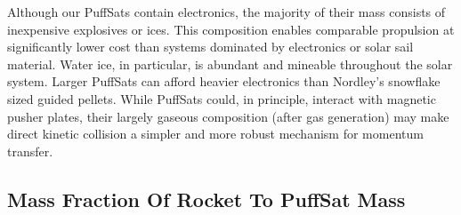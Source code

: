 \documentclass{article}
\begin{document}
Although our PuffSats contain electronics, the majority of their mass consists of inexpensive explosives or ices. This composition enables comparable propulsion at significantly lower cost than systems dominated by electronics or solar sail material. Water ice, in particular, is abundant and mineable throughout the solar system.  Larger PuffSats can afford heavier electronics than Nordley's snowflake sized guided pellets.  While PuffSats could, in principle, interact with magnetic pusher plates, their largely gaseous composition (after gas generation) may make direct kinetic collision a simpler and more robust mechanism for momentum transfer. 

\subsection{Mass Fraction Of Rocket To PuffSat Mass}
\end{document}

